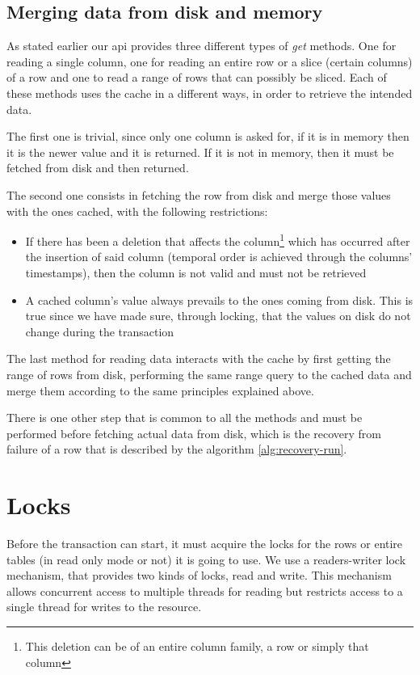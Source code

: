 \subsection{Merging data from disk and memory}
As stated earlier our \ac{api} provides three different types of \emph{get} methods. One for reading a single column, one for reading an entire row or a slice (certain columns) of a row and one to read a range of rows that can possibly be sliced. Each of these methods uses the cache in a different ways, in order to retrieve the intended data.

The first one is trivial, since only one column is asked for, if it is in memory then it is the newer value and it is returned. If it is not in memory, then it must be fetched from disk and then returned.

The second one consists in fetching the row from disk and merge those values with the ones cached, with the following restrictions:
\begin{itemize}
	\item If there has been a deletion that affects the column\footnote{This deletion can be of an entire column family, a row or simply that column} which has occurred after the insertion of said column (temporal order is achieved through the columns' timestamps), then the column is not valid and must not be retrieved
	\item A cached column's value always prevails to the ones coming from disk. This is true since we have made sure, through locking, that the values on disk do not change during the transaction
\end{itemize}

The last method for reading data interacts with the cache by first getting the range of rows from disk, performing the same range query to the cached data and merge them according to the same principles explained above.

There is one other step that is common to all the methods and must be performed before fetching actual data from disk, which is the recovery from failure of a row that is described by the algorithm \ref{alg:recovery-run}.

\section{Locks}
\label{sec:locks}
Before the transaction can start, it must acquire the locks for the rows or entire tables (in read only mode or not) it is going to use. We use a readers-writer lock mechanism, that provides two kinds of locks, read and write. This mechanism allows concurrent access to multiple threads for reading but restricts access to a single thread for writes to the resource.

